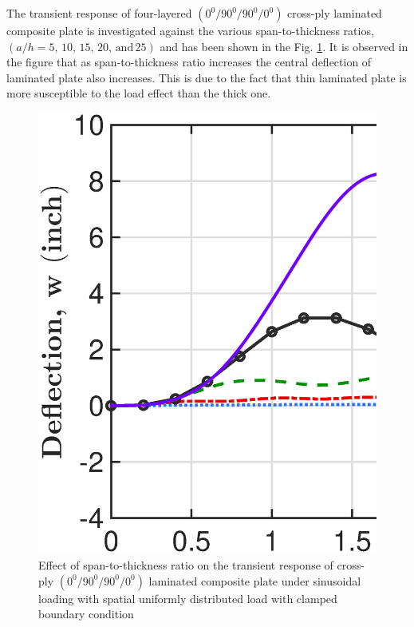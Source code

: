 \documentclass[3p,preprint,12pt]{elsarticle}
\begin{document}
The transient response of four-layered $(0^{0}/90^{0}/90^{0}/0^{0})$ cross-ply laminated composite plate is investigated against the various span-to-thickness ratios, $(a/h=5,\,10,\,15,\,20,\,\text{and}\,25)$ and has been shown
in the Fig. \ref{tran_a_h_study}. It is observed in the figure that as span-to-thickness ratio increases the central deflection of laminated plate also increases. This is due to the fact that thin laminated plate is more susceptible
to the load effect than the thick one. 

\begin{figure}
	\begin{centering}
		\graphicspath{{./All_Images/}}
		\includegraphics[scale=0.3]{4_Layered_Sym_Cross_Ply_h_a.eps}
		\par\end{centering}
	\caption{Effect of span-to-thickness ratio on the transient response of cross-ply
		$(0^{0}/90^{0}/90^{0}/0^{0})$ laminated composite plate under sinusoidal loading with spatial uniformly distributed load with clamped boundary condition}
	\label{tran_a_h_study}
\end{figure}
\end{document}
